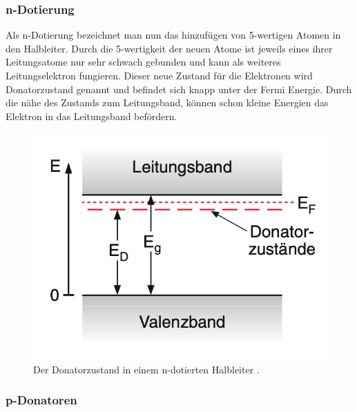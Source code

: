 \subsubsection{n-Dotierung}
Als n-Dotierung bezeichnet man nun das hinzufügen von 5-wertigen Atomen in den Halbleiter.
Durch die 5-wertigkeit der neuen Atome ist jeweils eines ihrer Leitungsatome nur sehr schwach gebunden und kann als weiteres Leitungselektron fungieren.
Dieser neue Zustand für die Elektronen wird Donatorzustand genannt und befindet sich knapp unter der Fermi Energie.
Durch die nähe des Zustands zum Leitungsband, können schon kleine Energien das Elektron in das Leitungsband befördern.
\begin{figure}[ht]
    \centering
    \includegraphics[scale = 0.5]{./bilder/n_Donatorschema_demtroeder.png}
    \caption{Der Donatorzustand in einem n-dotierten Halbleiter \cite{demtröder}.}
    \label{fig:n_donator}
\end{figure}

\subsubsection{p-Donatoren}

